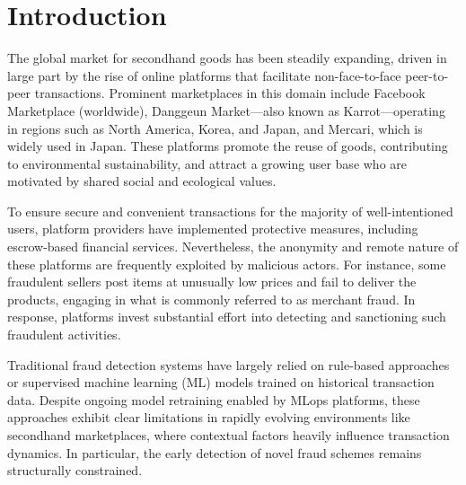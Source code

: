 \documentclass[sigconf]{acmart}
\begin{document}



\maketitle


\section{Introduction}
The global market for secondhand goods has been steadily expanding, driven in large part by the rise of online platforms that facilitate non-face-to-face peer-to-peer transactions. Prominent marketplaces in this domain include Facebook Marketplace (worldwide), Danggeun Market—also known as Karrot—operating in regions such as North America, Korea, and Japan, and Mercari, which is widely used in Japan. These platforms promote the reuse of goods, contributing to environmental sustainability, and attract a growing user base who are motivated by shared social and ecological values.

To ensure secure and convenient transactions for the majority of well-intentioned users, platform providers have implemented protective measures, including escrow-based financial services. Nevertheless, the anonymity and remote nature of these platforms are frequently exploited by malicious actors. For instance, some fraudulent sellers post items at unusually low prices and fail to deliver the products, engaging in what is commonly referred to as merchant fraud. In response, platforms invest substantial effort into detecting and sanctioning such fraudulent activities.

Traditional fraud detection systems have largely relied on rule-based approaches or supervised machine learning (ML) models trained on historical transaction data. Despite ongoing model retraining enabled by MLops platforms, these approaches exhibit clear limitations in rapidly evolving environments like secondhand marketplaces, where contextual factors heavily influence transaction dynamics. In particular, the early detection of novel fraud schemes remains structurally constrained.
\end{document}
